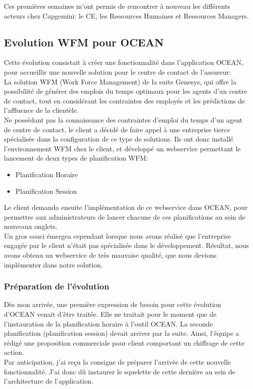 \documentclass{rapport}
\begin{document}
Ces premières semaines m'ont permis de rencontrer à nouveau les différents acteurs chez Capgemini: le CE, les Ressources Humaines et Ressources Managers.\\ 

\newpage
\subsection{Evolution WFM pour OCEAN}

Cette évolution consistait à créer une fonctionnalité dans l'application OCEAN, pour accueillir une nouvelle solution pour le centre de contact de l'assureur: \\
La solution WFM (Work Force Management) de la suite Genesys, qui offre la possibilité de générer des emplois du temps optimaux pour les agents d'un centre de contact, tout en considérant les contraintes des employés et les prédictions de l'affluence de la clientèle.\\

Ne possédant pas la connaissance des contraintes d'emploi du temps d'un agent de centre de contact, le client a décidé de faire appel à une entreprise tierce spécialisée dans la configuration de ce type de solutions. Ils ont donc installé l'environnement WFM chez le client, et développé un webservice permettant le lancement de deux types de planification WFM:
\begin{itemize}
  \item Planification Horaire
  \item Planification Session
\end{itemize}

Le client demanda ensuite l'implémentation de ce webservice dans OCEAN, pour permettre aux administrateurs de lancer chacune de ces planifications au sein de nouveaux onglets.\\

Un gros souci émergea cependant lorsque nous avons réalisé que l'entreprise engagée par le client n'était pas spécialisée dans le développement. Résultat, nous avons obtenu un webservice de très mauvaise qualité, que nous devions implémenter dans notre solution.

\subsubsection{Préparation de l'évolution}

Dès mon arrivée, une première expression de besoin pour cette évolution d'OCEAN venait d'être traitée. Elle ne traitait pour le moment que de l'instauration de la planification horaire à l'outil OCEAN. La seconde planification (planification session) devait arriver par la suite. Ainsi, l'équipe a rédigé une proposition commerciale pour client comportant un chiffrage de cette action.\\
Par anticipation, j'ai reçu la consigne de préparer l'arrivée de cette nouvelle fonctionnalité. J'ai donc dû instaurer le squelette de cette dernière au sein de l'architecture de l'application.\\
\end{document}
